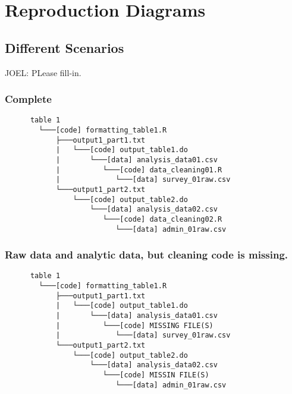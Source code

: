 \documentclass[]{book}
\begin{document}
\hypertarget{reproduction-diagrams}{%
\chapter{Reproduction Diagrams}\label{reproduction-diagrams}}

\hypertarget{different-scenarios}{%
\section{Different Scenarios}\label{different-scenarios}}

JOEL: PLease fill-in.

\hypertarget{complete}{%
\subsection{Complete}\label{complete}}

\begin{verbatim}
      table 1
        └───[code] formatting_table1.R
            ├───output1_part1.txt  
            |   └───[code] output_table1.do           
            |       └───[data] analysis_data01.csv
            |          └───[code] data_cleaning01.R
            |             └───[data] survey_01raw.csv
            └───output1_part2.txt  
                └───[code] output_table2.do           
                    └───[data] analysis_data02.csv
                       └───[code] data_cleaning02.R
                          └───[data] admin_01raw.csv  
\end{verbatim}

\hypertarget{raw-data-and-analytic-data-but-cleaning-code-is-missing.}{%
\subsection{Raw data and analytic data, but cleaning code is missing.}\label{raw-data-and-analytic-data-but-cleaning-code-is-missing.}}

\begin{verbatim}
      table 1
        └───[code] formatting_table1.R
            ├───output1_part1.txt  
            |   └───[code] output_table1.do           
            |       └───[data] analysis_data01.csv
            |          └───[code] MISSING FILE(S)
            |             └───[data] survey_01raw.csv
            └───output1_part2.txt  
                └───[code] output_table2.do           
                    └───[data] analysis_data02.csv
                       └───[code] MISSIN FILE(S)
                          └───[data] admin_01raw.csv  
\end{verbatim}
\end{document}
